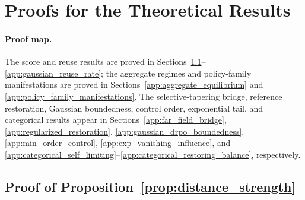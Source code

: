 \documentclass{article}
\theoremstyle{plain}
\theoremstyle{definition}
\theoremstyle{remark}
\begin{document}





\newpage
\appendix
\onecolumn
\section{Proofs for the Theoretical Results}
\label{app:theory_proofs}

\paragraph{Proof map.}
The score and reuse results are proved in
Sections~\ref{app:distance_strength}--\ref{app:gaussian_reuse_rate}; the
aggregate regimes and policy-family manifestations are proved in
Sections~\ref{app:aggregate_equilibrium} and
\ref{app:policy_family_manifestations}. The selective-tapering bridge,
reference restoration, Gaussian boundedness, control order, exponential tail,
and categorical results appear in Sections~\ref{app:far_field_bridge},
\ref{app:regularized_restoration}, \ref{app:gaussian_drpo_boundedness},
\ref{app:min_order_control}, \ref{app:exp_vanishing_influence}, and
\ref{app:categorical_self_limiting}--\ref{app:categorical_restoring_balance},
respectively.

\subsection{Proof of Proposition~\ref{prop:distance_strength}}
\label{app:distance_strength}
\end{document}
